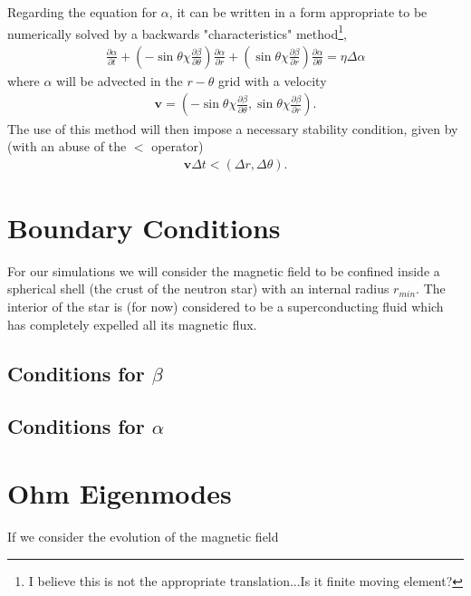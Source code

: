 \documentclass[letterpaper,10pt]{article}
\newcommand{\pp}{\partial}
\renewcommand{\vec}[1]{\boldsymbol#1}
\begin{document}
Regarding the equation for $\alpha$, it can be written in a form appropriate to be numerically solved by a backwards "characteristics" method\footnote{I believe this is not the appropriate translation...Is it finite moving element?},
\begin{eqnarray}
\frac{\pp\alpha}{\pp t}+\left(-\sin\theta\chi\frac{\pp\beta}{\pp\theta}\right)\frac{\pp \alpha}{\pp r}+\left(\sin\theta\chi\frac{\pp\beta}{\pp r}\right)\frac{\pp \alpha}{\pp \theta}=\eta\Delta\alpha
\end{eqnarray}
where $\alpha$ will be advected in the $r-\theta$ grid with a  velocity
\begin{eqnarray}
\vec{v}=\left(-\sin\theta\chi\frac{\pp\beta}{\pp \theta},\sin\theta\chi\frac{\pp\beta}{\pp r}\right).
\end{eqnarray}
The use of this method will then impose a necessary stability condition, given by (with an abuse of the $<$ operator)
\begin{eqnarray}
\vec{v}\Delta t<(\Delta r,\Delta\theta).
\end{eqnarray}
\section{Boundary Conditions}
For our simulations we will consider the magnetic field to be confined inside a spherical shell (the crust of the neutron star) with an internal radius $r_{min}$. The interior of the star is (for now) considered to be a superconducting fluid which has completely expelled all its magnetic flux.
\subsection{Conditions for $\beta$}
\subsection{Conditions for $\alpha$}
\section{Ohm Eigenmodes}
If we consider the evolution of the magnetic field
\end{document}
